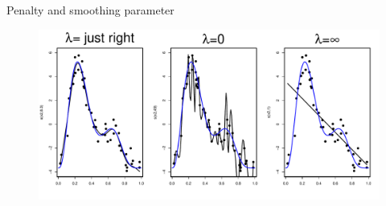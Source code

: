 \documentclass{beamer}
\begin{document}
\begin{frame}{Penalty and smoothing parameter}
  \begin{figure}[h]
    \begin{center}
      \includegraphics[width=\textwidth]{figures/penalty.pdf}
    \end{center}
  \end{figure}
\end{frame}
\end{document}
